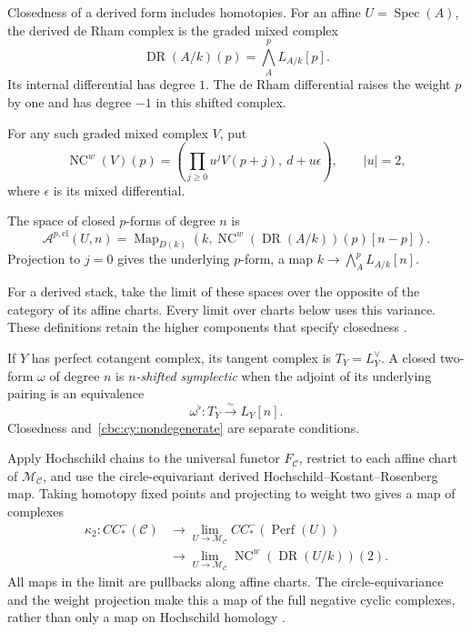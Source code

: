 Closedness of a derived form includes homotopies.
For an affine $U=\operatorname{Spec}(A)$, the derived de Rham complex is the graded mixed complex
\[
 \operatorname{DR}(A/k)(p)=\bigwedge_A^p L_{A/k}[p].
\]
Its internal differential has degree $1$.
The de Rham differential raises the weight $p$ by one and has degree $-1$ in this shifted complex.

For any such graded mixed complex $V$, put
\[
 \operatorname{NC}^{w}(V)(p)
   =\left(\prod_{j\geq0}u^j V(p+j),\ d+u\epsilon\right),
 \qquad |u|=2,
\]
where $\epsilon$ is its mixed differential.

The space of closed $p$-forms of degree $n$ is
\[
 \mathcal A^{p,\mathrm{cl}}(U,n)=
 \operatorname{Map}_{D(k)}
 \left(k,\operatorname{NC}^{w}(\operatorname{DR}(A/k))(p)[n-p]\right).
\]
Projection to $j=0$ gives the underlying $p$-form, a map
$k\to\bigwedge_A^pL_{A/k}[n]$.

For a derived stack, take the limit of these spaces over the opposite of the category of its affine charts.
Every limit over charts below uses this variance.
These definitions retain the higher components that specify closedness
\cite[Definitions~1.7--1.12]{PTVV}.

If $Y$ has perfect cotangent complex, its tangent complex is $T_Y=L_Y^\vee$.
A closed two-form $\omega$ of degree $n$ is \emph{$n$-shifted symplectic} when the adjoint of its underlying pairing is an equivalence
\begin{equation}\label{cbc:cy:nondegenerate}
 \omega^\flat:T_Y\xrightarrow{\sim}L_Y[n].
\end{equation}
Closedness and~\eqref{cbc:cy:nondegenerate} are separate conditions.

Apply Hochschild chains to the universal functor $F_{\mathcal C}$, restrict to each affine chart of $\mathcal M_{\mathcal C}$, and use the circle-equivariant derived Hochschild--Kostant--Rosenberg map.
Taking homotopy fixed points and projecting to weight two gives a map of complexes
\begin{equation}\label{cbc:cy:closed-map}
 \begin{aligned}
 \kappa_2:CC^-_*(\mathcal C)
 &\longrightarrow
 \lim_{U\to\mathcal M_{\mathcal C}}
                 CC^-_*(\operatorname{Perf}(U))\\
 &\longrightarrow
 \lim_{U\to\mathcal M_{\mathcal C}}
       \operatorname{NC}^{w}(\operatorname{DR}(U/k))(2).
 \end{aligned}
\end{equation}
All maps in the limit are pullbacks along affine charts.
The circle-equivariance and the weight projection make this a map of the full negative cyclic complexes, rather than only a map on Hochschild homology
\cite[Theorem~4.6 and Proposition~5.2]{BravDyckerhoff}.

